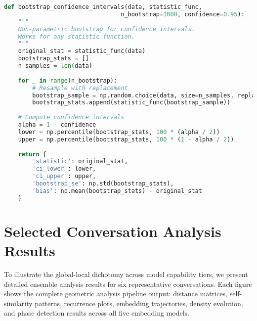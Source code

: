\documentclass[11pt,letterpaper]{article}
\begin{document}
\begin{lstlisting}[language=Python]
def bootstrap_confidence_intervals(data, statistic_func, 
                                 n_bootstrap=1000, confidence=0.95):
    """
    Non-parametric bootstrap for confidence intervals.
    Works for any statistic function.
    """
    original_stat = statistic_func(data)
    bootstrap_stats = []
    n_samples = len(data)
    
    for _ in range(n_bootstrap):
        # Resample with replacement
        bootstrap_sample = np.random.choice(data, size=n_samples, replace=True)
        bootstrap_stats.append(statistic_func(bootstrap_sample))
    
    # Compute confidence intervals
    alpha = 1 - confidence
    lower = np.percentile(bootstrap_stats, 100 * (alpha / 2))
    upper = np.percentile(bootstrap_stats, 100 * (1 - alpha / 2))
    
    return {
        'statistic': original_stat,
        'ci_lower': lower,
        'ci_upper': upper,
        'bootstrap_se': np.std(bootstrap_stats),
        'bias': np.mean(bootstrap_stats) - original_stat
    }
\end{lstlisting}



\section{Selected Conversation Analysis Results}

To illustrate the global-local dichotomy across model capability tiers, we present detailed ensemble analysis results for six representative conversations. Each figure shows the complete geometric analysis pipeline output: distance matrices, self-similarity patterns, recurrence plots, embedding trajectories, density evolution, and phase detection results across all five embedding models.

\afterpage{%
\clearpage
\thispagestyle{empty}

}

\afterpage{%
\clearpage
\thispagestyle{empty}

}

\afterpage{%
\clearpage
\thispagestyle{empty}

}
\end{document}
